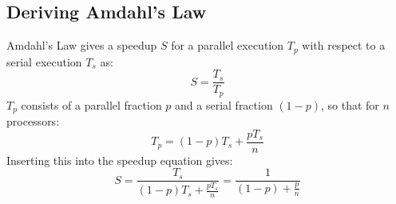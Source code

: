 \subsection{Deriving Amdahl's Law}
Amdahl's Law gives a speedup \( S \) for a parallel execution \(T_p\) with respect to a serial execution \(T_s\) as:
\[S=\frac{T_s}{T_p}\]
\(T_p\) consists of a parallel fraction \(p\) and a serial fraction \((1-p)\), so that for \(n\) processors:
\[T_p=(1-p)T_s+\frac{pT_s}{n}\]
Inserting this into the speedup equation gives:
\[S=\frac{T_s}{(1-p)T_s+\frac{pT_s}{n}}=\frac{1}{(1-p)+\frac{p}{n}}\]